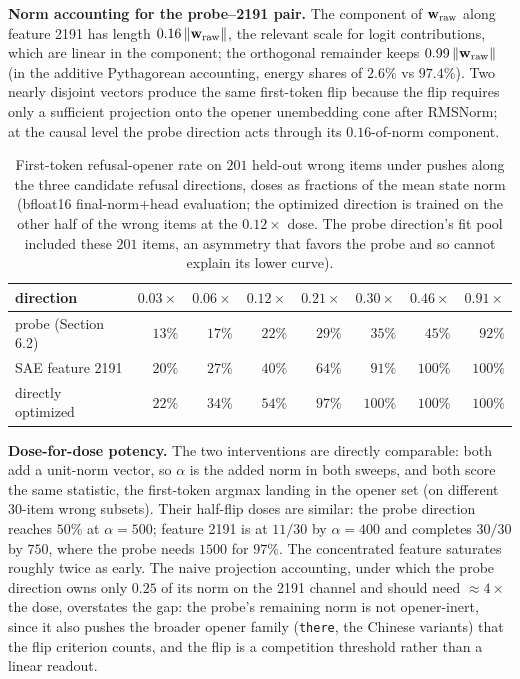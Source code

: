 \textbf{Norm accounting for the probe--2191 pair.} The component of
\(\mathbf{w}_{\rm raw}\) along feature 2191 has length
\(0.16\,\|\mathbf{w}_{\rm raw}\|\), the relevant scale for logit
contributions, which are linear in the component; the orthogonal
remainder keeps \(0.99\,\|\mathbf{w}_{\rm raw}\|\) (in the additive
Pythagorean accounting, energy shares of \(2.6\%\) vs \(97.4\%\)). Two
nearly disjoint vectors produce the same first-token flip because the
flip requires only a sufficient projection onto the opener unembedding
cone after RMSNorm; at the causal level the probe direction acts through
its \(0.16\)-of-norm component.

\begin{table}[!htbp]
\small
\centering
\caption{First-token refusal-opener rate on \(201\) held-out wrong
items under pushes along the three candidate refusal directions, doses
as fractions of the mean state norm (bfloat16 final-norm{+}head
evaluation; the optimized direction is trained on the other half of the
wrong items at the \(0.12\times\) dose. The probe direction's fit pool
included these \(201\) items, an asymmetry that favors the probe and
so cannot explain its lower curve).\label{tbl:threedirs}}
\begin{tabular}{@{}lrrrrrrr@{}}
\toprule
direction & \(0.03\times\) & \(0.06\times\) & \(0.12\times\) & \(0.21\times\) & \(0.30\times\) & \(0.46\times\) & \(0.91\times\) \\
\midrule
probe (Section 6.2) & \(13\%\) & \(17\%\) & \(22\%\) & \(29\%\) & \(35\%\) & \(45\%\) & \(92\%\) \\
SAE feature 2191 & \(20\%\) & \(27\%\) & \(40\%\) & \(64\%\) & \(91\%\) & \(100\%\) & \(100\%\) \\
directly optimized & \(22\%\) & \(34\%\) & \(54\%\) & \(97\%\) & \(100\%\) & \(100\%\) & \(100\%\) \\
\bottomrule
\end{tabular}
\end{table}

\textbf{Dose-for-dose potency.} The two interventions are directly comparable: both add a
unit-norm vector, so \(\alpha\) is the added norm in both sweeps, and
both score the same statistic, the first-token argmax landing in the
opener set (on different \(30\)-item wrong subsets). Their half-flip
doses are similar: the probe direction reaches \(50\%\) at
\(\alpha = 500\); feature 2191 is at \(11/30\) by \(\alpha = 400\) and
completes \(30/30\) by \(750\), where the probe needs \(1500\) for
\(97\%\). The concentrated feature saturates roughly twice as early. The
naive projection accounting, under which the probe direction owns only \(0.25\) of its norm on the 2191 channel and should need \(\approx 4\times\) the dose, overstates the gap: the probe's remaining
norm is not opener-inert, since it also pushes the broader opener family
(\texttt{there}, the Chinese variants) that the flip criterion counts,
and the flip is a competition threshold rather than a linear readout.

